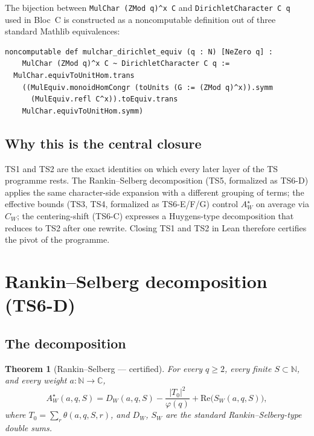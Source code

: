 \documentclass[11pt,a4paper]{article}
\newtheorem{theorem}{Theorem}[section]
\theoremstyle{definition}
\newcommand{\AWs}{A_W^{\star}}
\newcommand{\CWq}{C_W}
\newcommand{\DWq}{D_W}
\newcommand{\SWq}{S_W}
\begin{document}
The bijection between \verb|MulChar (ZMod q)^x C| and \verb|DirichletCharacter C q| used in Bloc~C is constructed as a noncomputable definition out of three standard Mathlib equivalences:

\begin{lstlisting}
noncomputable def mulchar_dirichlet_equiv (q : N) [NeZero q] :
    MulChar (ZMod q)^x C ~ DirichletCharacter C q :=
  MulChar.equivToUnitHom.trans
    ((MulEquiv.monoidHomCongr (toUnits (G := (ZMod q)^x)).symm
      (MulEquiv.refl C^x)).toEquiv.trans
    MulChar.equivToUnitHom.symm)
\end{lstlisting}

\subsection{Why this is the central closure}

TS1 and TS2 are the exact identities on which every later layer of the TS programme rests. The Rankin--Selberg decomposition (TS5, formalized as TS6-D) applies the same character-side expansion with a different grouping of terms; the effective bounds (TS3, TS4, formalized as TS6-E/F/G) control $\AWs$ on average via $\CWq$; the centering-shift (TS6-C) expresses a Huygens-type decomposition that reduces to TS2 after one rewrite. Closing TS1 and TS2 in Lean therefore certifies the pivot of the programme.

\section{Rankin--Selberg decomposition (TS6-D)}\label{sec:rs}

\subsection{The decomposition}

\begin{theorem}[Rankin--Selberg --- certified]\label{thm:rs}
For every $q \geq 2$, every finite $S \subset \mathbb{N}$, and every weight $a : \mathbb{N} \to \mathbb{C}$,
\[
  \AWs(a, q, S) = \DWq(a, q, S) - \frac{|T_0|^2}{\varphi(q)} + \mathrm{Re}\bigl(\SWq(a, q, S)\bigr),
\]
where $T_0 = \sum_r \theta(a, q, S, r)$, and $\DWq$, $\SWq$ are the standard Rankin--Selberg-type double sums.
\end{theorem}
\end{document}
